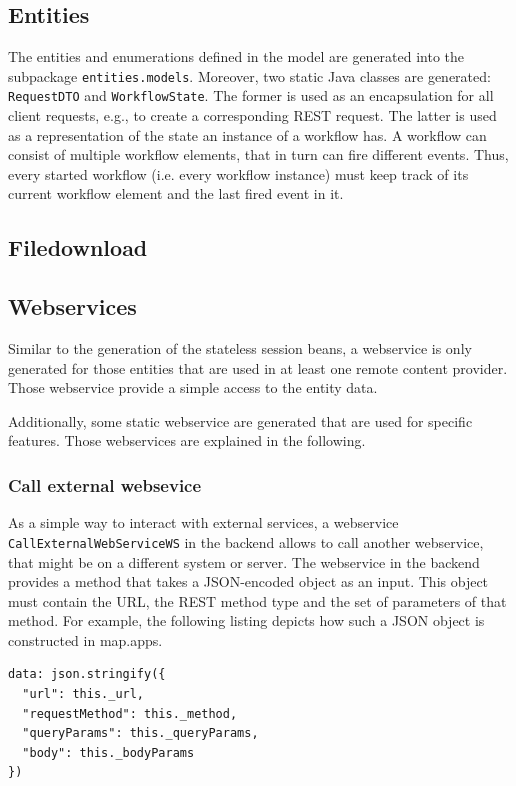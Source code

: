 \subsection{Entities}
The entities and enumerations defined in the \MD model are generated into the subpackage \lstinline|entities.models|. Moreover, two static Java classes are generated:  \lstinline|RequestDTO| and \lstinline|WorkflowState|. The former is used as an encapsulation for all client requests, e.g., to create a corresponding REST request. The latter is used as a representation of the state an instance of a workflow has. A workflow can consist of multiple workflow elements, that in turn can fire different events. Thus, every started workflow (i.e. every workflow instance) must keep track of its current workflow element and the last fired event in it.

\subsection{Filedownload}

\subsection{Webservices}
Similar to the generation of the stateless session beans, a webservice is only generated for those entities that are used in at least one remote content provider. Those webservice provide a simple access to the entity data.

Additionally, some static webservice are generated that are used for specific features. Those webservices are explained in the following.
\subsubsection{Call external websevice}
As a simple way to interact with external services, a webservice \lstinline|CallExternalWebServiceWS| in the backend allows to call another webservice, that might be on a different system or server. The webservice in the backend provides a method that takes a JSON-encoded object as an input. This object must contain the URL, the REST method type and the set of parameters of that method. For example, the following listing depicts how such a JSON object is constructed in map.apps.

\begin{lstlisting}[language=MD2, label=lst:callExtWSJSON, caption=JSON-encoded object containing information to call an external webservice]
data: json.stringify({
  "url": this._url,
  "requestMethod": this._method,
  "queryParams": this._queryParams,
  "body": this._bodyParams
})
\end{lstlisting}

